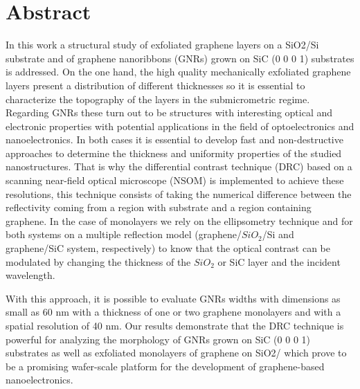 \cleardoublepage

%	
\chapter{Abstract}%
In this work a structural study of exfoliated graphene layers on a SiO2/Si substrate and of graphene nanoribbons (GNRs) grown on SiC (0 0 0 1) substrates is addressed. On the one hand, the high quality mechanically exfoliated graphene layers present a distribution of different thicknesses so it is essential to characterize the topography of the layers in the submicrometric regime. Regarding GNRs these turn out to be structures with interesting optical and electronic properties with potential applications in the field of optoelectronics and nanoelectronics. In both cases it is essential to develop fast and non-destructive approaches to determine the thickness and uniformity properties of the studied nanostructures.  That is why the differential contrast technique (DRC) based on a scanning near-field optical microscope (NSOM) is implemented to achieve these resolutions, this technique consists of taking the numerical difference between the reflectivity coming from a region with substrate and a region containing graphene. In the case of monolayers we rely on the ellipsometry technique and for both systems on a multiple reflection model (graphene/$SiO_2$/Si and graphene/SiC system, respectively) to know that the optical contrast can be modulated by changing the thickness of the $SiO_2$ or SiC layer and the incident wavelength.  

With this approach, it is possible to evaluate GNRs widths with dimensions as small as 60 nm with a thickness of one or two graphene monolayers and with a spatial resolution of 40 nm. Our results demonstrate that the DRC technique is powerful for analyzing the morphology of GNRs grown on SiC (0 0 0 1) substrates as well as exfoliated monolayers of graphene on SiO2/ which prove to be a promising wafer-scale platform for the development of graphene-based nanoelectronics.

